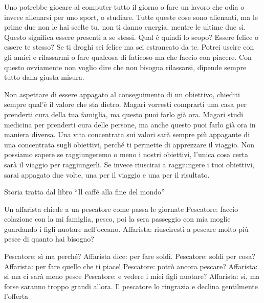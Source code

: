 \documentclass[12pt]{book} %
\begin{document}
\bigskip

Uno potrebbe giocare al computer tutto il giorno o fare un lavoro che odia o invece allenarsi per uno sport, o studiare.
Tutte queste cose sono alienanti, ma le prime due non le hai scelte tu, non ti danno energia, mentre le ultime due
sì. Questo significa essere presenti a se stessi. Qual è quindi
lo scopo? Essere felice o essere te stesso? Se ti droghi sei felice ma sei estraneato da te. Potrei uscire con gli
amici e rilassarmi o fare qualcosa di faticoso ma che faccio con piacere. Con questo ovviamente non voglio dire che non
bisogna rilassarsi, dipende sempre tutto dalla giusta misura.


\bigskip

Non aspettare di essere appagato al conseguimento di un obiettivo, chiediti sempre qual'è il valore
che sta dietro. Magari vorresti comprarti una casa per prenderti cura della tua famiglia, ma questo puoi farlo già ora.
Magari studi medicina per prenderti cura delle persone, ma anche questo puoi farlo già ora in maniera diversa. Una vita
concentrata sui valori sarà sempre più appagante di una concentrata sugli obiettivi, perché ti permette di apprezzare
il viaggio. Non possiamo sapere se raggiungeremo o meno i nostri obiettivi, l'unica cosa certa
sarà il viaggio per raggiungerli. Se invece riuscirai a raggiungere i tuoi obiettivi, sarai appagato due volte, una per
il viaggio e una per il risultato.


\bigskip

\begin{mdframed}[linewidth=1pt]
Storia tratta dal libro “Il caffè alla fine del
mondo”

Un affarista chiede a un pescatore come passa le giornate\newline
Pescatore: faccio colazione con la mi famiglia, pesco, poi la sera passeggio con mia moglie guardando i figli nuotare
nell'oceano.\newline
Affarista: riusciresti a pescare molto più pesce di quanto hai bisogno?

Pescatore: sì ma perché? \newline
Affarista dice: per fare soldi. \newline
Pescatore: soldi per cosa? \newline
Affarista: per fare quello che ti piace! \newline
Pescatore: potrò ancora pescare?\newline
Affarista: si ma ci sarà meno pesce\newline
Pescatore: e vedere i miei figli nuotare?\newline
Affarista: si, ma forse saranno troppo grandi allora.\newline
Il pescatore lo ringrazia e declina gentilmente l'offerta 
\end{mdframed}
\end{document}
